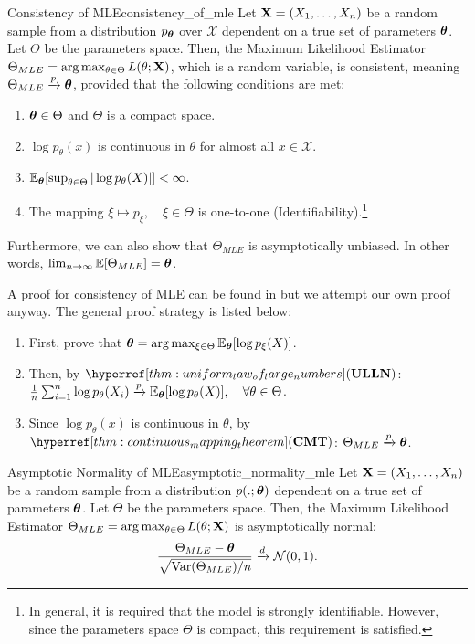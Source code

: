 \begin{proof*}
\begin{proposition}{Consistency of MLE}{consistency_of_mle}
    Let ${\bf X}=(X_1, \dots, X_n)$ be a random sample from a distribution $p_{\boldsymbol{\theta}}$ over $\mathcal{X}$ dependent on a true set of parameters $\boldsymbol{\theta}$. Let $\Theta$ be the parameters space. Then, the Maximum Likelihood Estimator $\Theta_{MLE} = \arg\max_{\theta\in\Theta}L(\theta;{\bf X})$, which is a random variable, is consistent, meaning $\Theta_{MLE}\xrightarrow{p}\boldsymbol{\theta}$, provided that the following conditions are met:
    \begin{enumerate}
        \item $\boldsymbol{\theta}\in\Theta$ and $\Theta$ is a compact space. 
        \item $\log p_\theta(x)$ is continuous in $\theta$ for almost all $x\in\mathcal{X}$.
        \item $\mathbb{E}_{\boldsymbol{\theta}}[\sup_{\theta\in\Theta}|\log p_\theta(X)|] < \infty$.
        \item The mapping $\xi\mapsto p_\xi, \quad \xi\in\Theta$ is one-to-one (Identifiability).\footnote{In general, it is required that the model is strongly identifiable. However, since the parameters space $\Theta$ is compact, this requirement is satisfied.}
    \end{enumerate} 
    
    \noindent Furthermore, we can also show that $\Theta_{MLE}$ is asymptotically unbiased. In other words, $\lim_{n\to\infty}\mathbb{E}[\Theta_{MLE}] = \boldsymbol{\theta}$.
\end{proposition} 

\begin{proof*}
    A proof for consistency of MLE can be found in \cite[Theorem 2.5]{book:newey1994} but we attempt our own proof anyway. The general proof strategy is listed below:
    \begin{enumerate}
        \item First, prove that $\boldsymbol{\theta}=\arg\max_{\xi\in\Theta}\mathbb{E}_{\boldsymbol{\theta}} [\log p_\xi(X)]$. 
        \item Then, by $\ULLN$: $\frac{1}{n}\sum_{i=1}^n \log p_\theta(X_i)\xrightarrow{p}\mathbb{E}_{\boldsymbol{\theta}}[\log p_\theta(X)], \quad \forall \theta\in\Theta$.
        \item Since $\log p_\theta(x)$ is continuous in $\theta$, by $\CMT$: $\Theta_{MLE} \xrightarrow{p} \boldsymbol{\theta}$.
    \end{enumerate} 
\end{proof*} 

\begin{proposition}{Asymptotic Normality of MLE}{asymptotic_normality_mle}
    Let ${\bf X}=(X_1, \dots, X_n)$ be a random sample from a distribution $p(.;\boldsymbol{\theta})$ dependent on a true set of parameters $\boldsymbol{\theta}$. Let $\Theta$ be the parameters space. Then, the Maximum Likelihood Estimator $\Theta_{MLE} = \arg\max_{\theta\in\Theta}L(\theta;{\bf X})$ is asymptotically normal:
    \begin{equation}
        \frac{\Theta_{MLE} - \boldsymbol{\theta}}{\sqrt{\mathrm{Var}(\Theta_{MLE})/n}} \xrightarrow{d} \mathcal{N}(0,1).
    \end{equation}
\end{proposition} 


\end{proof*}
